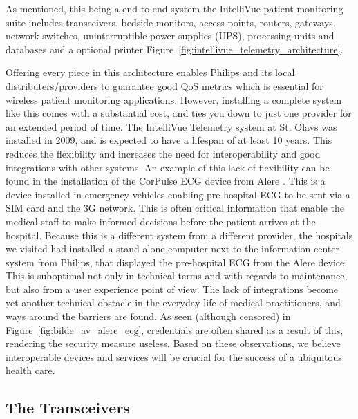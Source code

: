 As mentioned, this being a end to end system the IntelliVue patient monitoring suite includes transceivers, bedside monitors, access points, routers, gateways, network switches, uninterruptible power supplies (UPS), processing units and databases and a optional printer Figure~\ref{fig:intellivue_telemetry_architecture}.


Offering every piece in this architecture enables Philips and its local distributers/providers to guarantee good QoS metrics which is essential for wireless patient monitoring applications. However, installing a complete system like this comes with a substantial cost, and ties you down to just one provider for an extended period of time. The IntelliVue Telemetry system at St. Olavs was installed in 2009, and is expected to have a lifespan of at least 10 years. This reduces the flexibility and increases the need for interoperability and good integrations with other systems. An example of this lack of flexibility can be found in the installation of the CorPulse ECG device from Alere \cite{alere}. This is a device installed in emergency vehicles enabling pre-hospital ECG to be sent via a SIM card and the 3G network. This is often critical information that enable the medical staff to make informed decisions before the patient arrives at the hospital. Because this is a different system from a different provider, the hospitals we visited had installed a stand alone computer next to the information center system from Philips, that displayed the pre-hospital ECG from the Alere device. This is suboptimal not only in technical terms and with regards to maintenance, but also from a user experience point of view. The lack of integrations become yet another technical obstacle in the everyday life of medical practitioners, and ways around the barriers are found. As seen (although censored) in Figure~\ref{fig:bilde_av_alere_ecg}, credentials are often shared as a result of this, rendering the security measure useless. Based on these observations, we believe interoperable devices and services will be crucial for the success of a ubiquitous health care.


\subsection{The Transceivers} %
\label{sub:the_transceivers}

